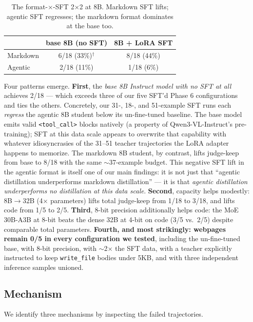 \documentclass[11pt]{article}
\begin{document}
\begin{table}[ht]
\centering
\caption{The format-$\times$-SFT 2$\times$2 at 8B. Markdown SFT lifts; agentic SFT regresses; the markdown format dominates at the base too.}
\label{tab:two-by-two}
\begin{tabular}{lcc}
\toprule
& base 8B (no SFT) & 8B + LoRA SFT \\
\midrule
Markdown & 6/18 (33\%)$^{\dagger}$ & 8/18 (44\%) \\
Agentic & 2/18 (11\%) & 1/18 (6\%) \\
\bottomrule
\end{tabular}
\end{table}

Four patterns emerge.
\textbf{First}, the \emph{base 8B Instruct model with no SFT at all} achieves 2/18 --- which exceeds three of our five SFT'd Phase 6 configurations and ties the others. Concretely, our 31-, 18-, and 51-example SFT runs each \emph{regress} the agentic 8B student below its un-fine-tuned baseline. The base model emits valid \texttt{<tool\_call>} blocks natively (a property of Qwen3-VL-Instruct's pre-training); SFT at this data scale appears to overwrite that capability with whatever idiosyncrasies of the 31--51 teacher trajectories the LoRA adapter happens to memorize. The markdown 8B student, by contrast, lifts judge-keep from base to 8/18 with the same $\sim$37-example budget. This negative SFT lift in the agentic format is itself one of our main findings: it is not just that ``agentic distillation underperforms markdown distillation'' --- it is that \emph{agentic distillation underperforms no distillation at this data scale}.
\textbf{Second}, capacity helps modestly: 8B$\to$32B (4$\times$ parameters) lifts total judge-keep from 1/18 to 3/18, and lifts code from 1/5 to 2/5. \textbf{Third}, 8-bit precision additionally helps code: the MoE 30B-A3B at 8-bit beats the dense 32B at 4-bit on code (3/5 vs.\ 2/5) despite comparable total parameters. \textbf{Fourth, and most strikingly: webpages remain 0/5 in every configuration we tested}, including the un-fine-tuned base, with 8-bit precision, with $\sim$2$\times$ the SFT data, with a teacher explicitly instructed to keep \texttt{write\_file} bodies under 5KB, and with three independent inference samples unioned.

\subsection{Mechanism}

We identify three mechanisms by inspecting the failed trajectories.
\end{document}

